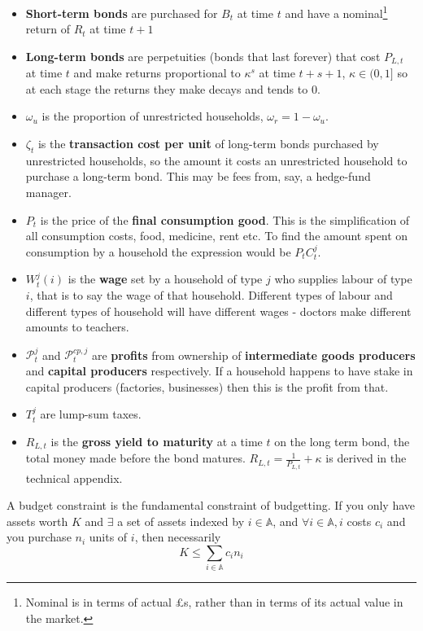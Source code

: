 \documentclass[notitlepage,12pt]{report}
\begin{document}
\begin{appendices}
	\begin{itemize}
		\item {\bf Short-term bonds} are purchased for \(B_t\) at time \(t\) and have a nominal\footnote{Nominal is in terms of actual \pounds s, rather than in terms of its actual value in the market.} return of \(R_t\) at time \(t+1\)
		\item {\bf Long-term bonds} are perpetuities (bonds that last forever) that cost \(P_{L,t}\) at time \(t\) and make returns proportional to \(\kappa^s\) at time \(t+s+1\), \(\kappa\in(0,1]\) so at each stage the returns they make decays and tends to 0.
		\item \(\omega_u\) is the proportion of unrestricted households, \(\omega_r=1-\omega_u\).
		\item \(\zeta_t\) is the {\bf transaction cost per unit} of long-term bonds purchased by unrestricted households, so the amount it costs an unrestricted household to purchase a long-term bond. This may be fees from, say, a hedge-fund manager.
		\item \(P_t\) is the price of the {\bf final consumption good}. This is the simplification of all consumption costs, food, medicine, rent etc. To find the amount spent on consumption by a household the expression would be \(P_tC_t^j\).
		\item \(W_t^j(i)\) is the {\bf wage} set by a household of type \(j\) who supplies labour of type \(i\), that is to say the wage of that household. Different types of labour and different types of household will have different wages - doctors make different amounts to teachers.
		\item \(\mathcal{P}_t^j\) and \(\mathcal{P}_t^{cp,j}\) are {\bf profits} from ownership of {\bf intermediate goods producers} and {\bf capital producers} respectively. If a household happens to have stake in capital producers (factories, businesses) then this is the profit from that.
		\item \(T_t^j\) are lump-sum taxes.
		\item \(R_{L,t}\) is the {\bf gross yield to maturity} at a time \(t\) on the long term bond, the total money made before the bond matures. \(R_{L,t}=\frac{1}{P_{L,t}}+\kappa\) is derived in the technical appendix.\cite{chen_technical_2011}
	\end{itemize}
	
	A budget constraint is the fundamental constraint of budgetting. If you only have assets worth \(K\) and \(\exists\) a set of assets indexed by \(i\in\mathbb{A}\), and \(\forall i\in\mathbb{A}, i\) costs \(c_i\) and you purchase \(n_i\) units of \(i\), then necessarily
	\begin{equation*}
	K\leq \sum_{i\in\mathbb{A}}c_in_i
	\end{equation*}
	

\end{appendices}
\end{document}
